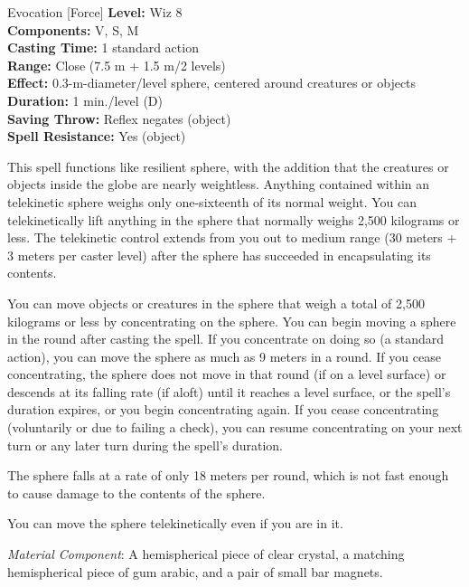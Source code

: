 {Evocation [Force]}
{
	\textbf{Level:}
	Wiz 8\\
	\textbf{Components:}
	V, S, M\\
	\textbf{Casting Time:}
	1 standard action\\
	\textbf{Range:}
	Close (7.5 m + 1.5 m/2 levels)\\
	\textbf{Effect:}
	0.3-m-diameter/level sphere, centered around creatures or objects\\
	\textbf{Duration:}
	1 min./level (D)\\
	\textbf{Saving Throw:}
	Reflex negates (object)\\
	\textbf{Spell Resistance:}
	Yes (object)\\
}
{
	This spell functions like resilient sphere, with the addition that the creatures or objects inside the globe are nearly weightless. Anything contained within an telekinetic sphere weighs only one-sixteenth of its normal weight. You can telekinetically lift anything in the sphere that normally weighs 2,500 kilograms or less. The telekinetic control extends from you out to medium range (30 meters + 3 meters per caster level) after the sphere has succeeded in encapsulating its contents.

	You can move objects or creatures in the sphere that weigh a total of 2,500 kilograms or less by concentrating on the sphere. You can begin moving a sphere in the round after casting the spell. If you concentrate on doing so (a standard action), you can move the sphere as much as 9 meters in a round. If you cease concentrating, the sphere does not move in that round (if on a level surface) or descends at its falling rate (if aloft) until it reaches a level surface, or the spell's duration expires, or you begin concentrating again. If you cease concentrating (voluntarily or due to failing a  check), you can resume concentrating on your next turn or any later turn during the spell's duration.

	The sphere falls at a rate of only 18 meters per round, which is not fast enough to cause damage to the contents of the sphere.

	You can move the sphere telekinetically even if you are in it.

	\textit{Material Component}:
	A hemispherical piece of clear crystal, a matching hemispherical piece of gum arabic, and a pair of small bar magnets.

}
